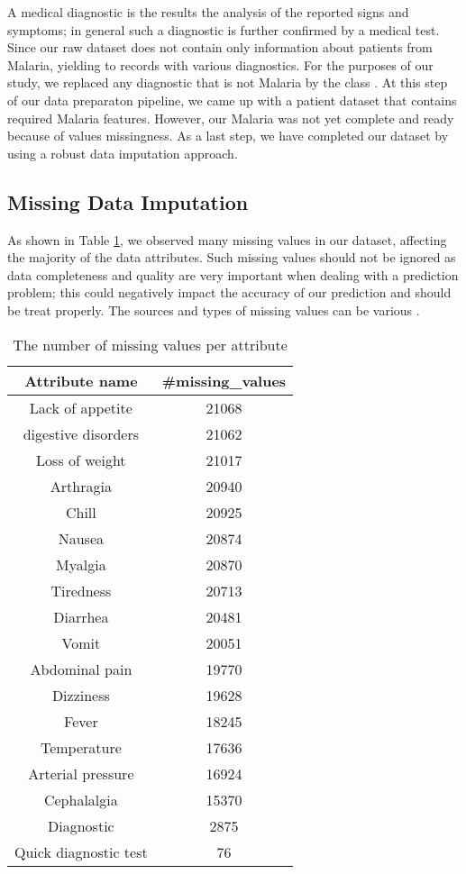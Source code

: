 A medical diagnostic is the results the analysis of the reported signs and symptoms; in general such a diagnostic is further confirmed by a medical test.
Since our raw dataset does not contain only information about patients from Malaria, yielding to records with various diagnostics. For the purposes of 
our study, we replaced any diagnostic that is not Malaria by the class . At this step of our data preparaton pipeline, we came 
up with a patient dataset that contains required Malaria features. However, our Malaria was not yet complete and ready because of values missingness.
As a last step, we have completed our dataset by using a robust data imputation approach.


\subsection{Missing Data Imputation}
As shown in Table \ref{table-missing}, we observed many missing values in our dataset, affecting the majority of the data attributes. Such missing values
should not be ignored as data completeness and quality are very important when dealing with a prediction problem; this could negatively impact the accuracy
of our prediction and should be treat properly. The sources and types of missing values can be various \cite{Al18}.

\begin{table}[!ht]
\centering
\begin{tabular}{cc}
\textbf{Attribute name} & \textbf{\#missing\_values}\\
\toprule
Lack of appetite &    21068 \\
digestive disorders & 21062 \\
Loss of weight &   21017 \\
Arthragia &     20940\\
Chill &      20925\\
Nausea &     20874\\
Myalgia &    20870\\
Tiredness&   20713 \\
Diarrhea &     20481\\
Vomit &        20051 \\
Abdominal pain &  19770 \\
Dizziness &       19628 \\
Fever &        18245 \\
Temperature &     17636 \\
Arterial pressure &    16924 \\
Cephalalgia &       15370 \\
Diagnostic  &     2875 \\
Quick diagnostic test &  76 \\
\bottomrule
\end{tabular}
\vspace*{.5cm}
\caption{The number of missing values per attribute}\label{table-missing}
\end{table} 
